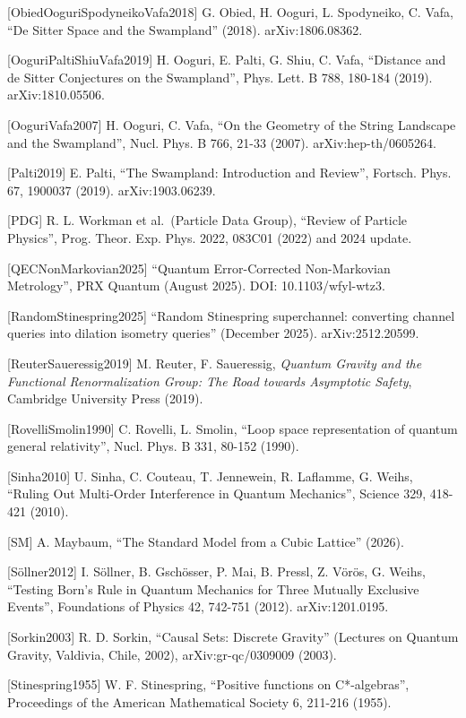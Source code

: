 \documentclass[
]{article}
\begin{document}
{[}ObiedOoguriSpodyneikoVafa2018{]} G. Obied, H. Ooguri, L. Spodyneiko,
C. Vafa, ``De Sitter Space and the Swampland'' (2018). arXiv:1806.08362.

{[}OoguriPaltiShiuVafa2019{]} H. Ooguri, E. Palti, G. Shiu, C. Vafa,
``Distance and de Sitter Conjectures on the Swampland'', Phys. Lett. B
788, 180-184 (2019). arXiv:1810.05506.

{[}OoguriVafa2007{]} H. Ooguri, C. Vafa, ``On the Geometry of the String
Landscape and the Swampland'', Nucl. Phys. B 766, 21-33 (2007).
arXiv:hep-th/0605264.

{[}Palti2019{]} E. Palti, ``The Swampland: Introduction and Review'',
Fortsch. Phys. 67, 1900037 (2019). arXiv:1903.06239.

{[}PDG{]} R. L. Workman et al.~(Particle Data Group), ``Review of
Particle Physics'', Prog. Theor. Exp. Phys. 2022, 083C01 (2022) and 2024
update.

{[}QECNonMarkovian2025{]} ``Quantum Error-Corrected Non-Markovian
Metrology'', PRX Quantum (August 2025). DOI: 10.1103/wfyl-wtz3.

{[}RandomStinespring2025{]} ``Random Stinespring superchannel:
converting channel queries into dilation isometry queries'' (December
2025). arXiv:2512.20599.

{[}ReuterSaueressig2019{]} M. Reuter, F. Saueressig, \emph{Quantum
Gravity and the Functional Renormalization Group: The Road towards
Asymptotic Safety}, Cambridge University Press (2019).

{[}RovelliSmolin1990{]} C. Rovelli, L. Smolin, ``Loop space
representation of quantum general relativity'', Nucl. Phys. B 331,
80-152 (1990).

{[}Sinha2010{]} U. Sinha, C. Couteau, T. Jennewein, R. Laflamme, G.
Weihs, ``Ruling Out Multi-Order Interference in Quantum Mechanics'',
Science 329, 418-421 (2010).

{[}SM{]} A. Maybaum, ``The Standard Model from a Cubic Lattice'' (2026).

{[}Söllner2012{]} I. Söllner, B. Gschösser, P. Mai, B. Pressl, Z. Vörös,
G. Weihs, ``Testing Born's Rule in Quantum Mechanics for Three Mutually
Exclusive Events'', Foundations of Physics 42, 742-751 (2012).
arXiv:1201.0195.

{[}Sorkin2003{]} R. D. Sorkin, ``Causal Sets: Discrete Gravity''
(Lectures on Quantum Gravity, Valdivia, Chile, 2002),
arXiv:gr-qc/0309009 (2003).

{[}Stinespring1955{]} W. F. Stinespring, ``Positive functions on
C*-algebras'', Proceedings of the American Mathematical Society 6,
211-216 (1955).
\end{document}

